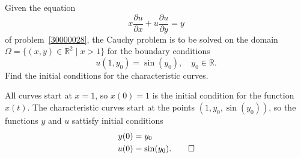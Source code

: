 Given the equation
\[
x
\frac{\partial u}{\partial x}
+
u
\frac{\partial u}{\partial y}
=
y
\]
of problem~\ref{30000028}, the Cauchy problem is to be solved on the
domain $\Omega = \{(x,y)\in\mathbb{R}^2 \mid x>1\}$
for the
boundary conditions
\[
u(1,y_0)
=
\sin(y_0),\quad y_0\in\mathbb{R}.
\]
Find the initial conditions for the characteristic curves.

\begin{loesung}
All curves start at $x=1$, so $x(0)=1$ is the initial condition for the
function $x(t)$.
The characteristic curves start at the points
$(1,y_0,\sin(y_0))$, so the functions $y$ and $u$ sattisfy initial
conditions
\begin{align*}
y(0) &= y_0       \\
u(0) &= \sin(y_0).
\qedhere
\end{align*}
\end{loesung}

